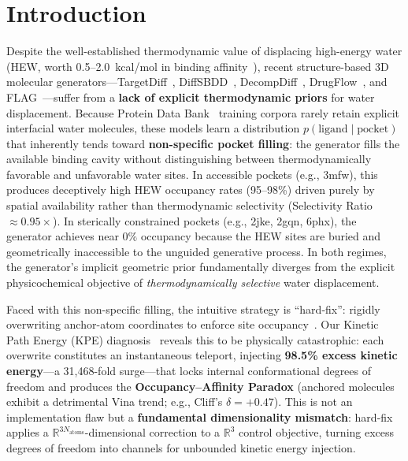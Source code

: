 \documentclass{article}
\newcommand{\reals}{\ensuremath{\mathbb{R}}}
\begin{document}
\section{Introduction}

Despite the well-established thermodynamic value of displacing high-energy
water (HEW, worth 0.5--2.0~kcal/mol in binding
affinity~\cite{dunitz1994,abel2008,michel2009,ladbury1996,spyrakis2017}),
recent structure-based 3D molecular
generators---TargetDiff~\cite{guan2023targetdiff},
DiffSBDD~\cite{schneuing2024diffsbdd}, DecompDiff~\cite{guan2023decompdiff},
DrugFlow~\cite{drugflow2024}, and FLAG~\cite{zhang2024flag}---suffer from a \textbf{lack of explicit thermodynamic priors} for water
displacement.  Because Protein Data Bank~\cite{berman2000pdb} training
corpora rarely retain explicit interfacial water molecules, these models
learn a distribution $p(\text{ligand} \mid \text{pocket})$ that inherently
tends toward \textbf{non-specific pocket filling}: the generator fills the
available binding cavity without distinguishing between thermodynamically
favorable and unfavorable water sites.  In accessible pockets (e.g.,
3mfw), this produces deceptively high HEW occupancy rates (95--98\%)
driven purely by spatial availability rather than thermodynamic
selectivity (Selectivity Ratio $\approx 0.95\times$).  In sterically
constrained pockets (e.g., 2jke, 2gqn, 6phx), the generator achieves near
0\% occupancy because the HEW sites are buried and geometrically
inaccessible to the unguided generative process.  In both regimes, the
generator's implicit geometric prior fundamentally diverges from the
explicit physicochemical objective of \emph{thermodynamically selective}
water displacement.

Faced with this non-specific filling, the intuitive strategy is ``hard-fix'':
rigidly overwriting anchor-atom coordinates to enforce site
occupancy~\cite{griesbacher2026ebmol,esfield2026}.  Our Kinetic Path
Energy (KPE) diagnosis~\cite{li2026kpe} reveals this to be physically
catastrophic: each overwrite constitutes an instantaneous teleport,
injecting \textbf{98.5\% excess kinetic energy}---a 31,468-fold
surge---that locks internal conformational degrees of freedom and
produces the \textbf{Occupancy--Affinity Paradox} (anchored molecules
exhibit a detrimental Vina trend; e.g., Cliff's $\delta=+0.47$).
This is not an implementation flaw but a \textbf{fundamental
dimensionality mismatch}: hard-fix applies a
$\reals^{3N_{\text{atoms}}}$-dimensional correction to a $\reals^3$
control objective, turning excess degrees of freedom into channels for
unbounded kinetic energy injection.
\end{document}
